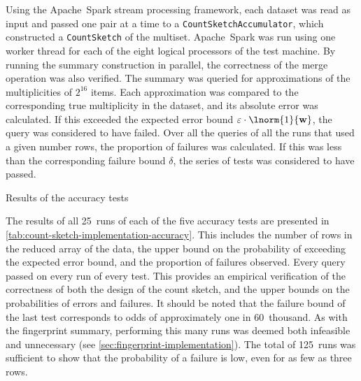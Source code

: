 Using the Apache~Spark stream processing framework, each dataset was read as input and passed one pair at a time to a \lstinline{CountSketchAccumulator}, which constructed a \lstinline{CountSketch} of the multiset.
Apache~Spark was run using one worker thread for each of the eight logical processors of the test machine.
By running the summary construction in parallel, the correctness of the merge operation was also verified.
The summary was queried for approximations of the multiplicities of \( 2^{16} \) items.
Each approximation was compared to the corresponding true multiplicity in the dataset, and its absolute error was calculated.
If this exceeded the expected error bound \( \varepsilon \cdot \lnorm{1}{\mathvector{w}} \), the query was considered to have failed.
Over all the queries of all the runs that used a given number rows, the proportion of failures was calculated.
If this was less than the corresponding failure bound \( \delta \), the series of tests was considered to have passed.

\begin{table}
  \centering
  \caption{Results of the accuracy tests}
  \label{tab:count-sketch-implementation-accuracy}
\end{table}

The results of all \num{25}~runs of each of the five accuracy tests are presented in \cref{tab:count-sketch-implementation-accuracy}.
This includes the number of rows in the reduced array of the data, the upper bound on the probability of exceeding the expected error bound, and the proportion of failures observed.
Every query passed on every run of every test.
This provides an empirical verification of the correctness of both the design of the count sketch, and the upper bounds on the probabilities of errors and failures.
It should be noted that the failure bound of the last test corresponds to odds of approximately one in \num{60}~thousand.
As with the fingerprint summary, performing this many runs was deemed both infeasible and unnecessary (see \cref{sec:fingerprint-implementation}).
The total of \num{125}~runs was sufficient to show that the probability of a failure is low, even for as few as three rows.

